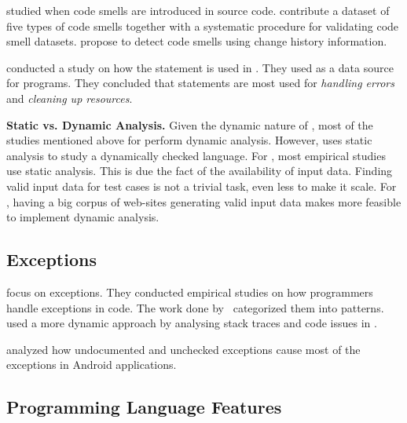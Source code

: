 \cite{tufanoWhenWhyYour2015,tufanoWhenWhyYour2017} studied when code
smells are introduced in source code.
\cite{palombaLandfillOpenDataset2015}
contribute a dataset of five types of code smells together with a systematic procedure for validating code smell datasets.
\cite{palombaDetectingBadSmells2013} propose to detect code smells using change history information.

\cite{nagappanEmpiricalStudyGoto2015} conducted a study on how the
 statement is used in \cc{}.
They used \github{} as a data source for \cc{} programs.
They concluded that  statements are most used for
\emph{handling errors} and \emph{cleaning up resources}.

\textbf{Static vs. Dynamic Analysis.}
Given the dynamic nature of \javascript, most of the studies mentioned
above for \javascript{} perform dynamic analysis.
However, \cite{callauHowWhyDevelopers2013} uses static analysis to study
a dynamically checked language.
For \java, most empirical studies use static analysis.
This is due the fact of the availability of input data.
Finding valid input data for test cases is not a trivial task,
even less to make it scale.
For \javascript, having a big corpus of web-sites generating valid
input data makes more feasible to implement dynamic analysis.

\subsection*{Exceptions}

\cite{keryExaminingProgrammerPractices2016,asaduzzamanHowDevelopersUse2016} focus on exceptions.
They conducted empirical studies on how programmers handle exceptions in \java{} code.
The work done by~\cite{nakshatriAnalysisExceptionHandling2016} categorized them into patterns.
\cite{coelhoUnveilingExceptionHandling2015} used a more dynamic approach by analysing stack traces and code issues in \github{}.

\cite{kechagiaUndocumentedUncheckedExceptions2014} analyzed how undocumented and
unchecked exceptions cause most of the exceptions in
Android applications.

\subsection*{Programming Language Features}


